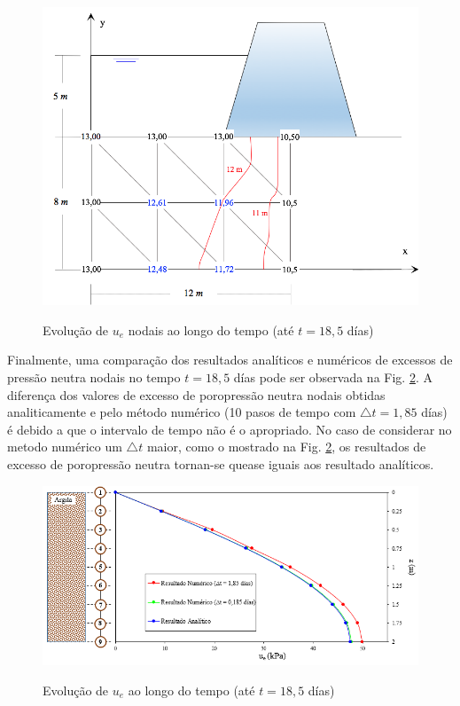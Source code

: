 \documentclass{article} %
\begin{document}
\begin{figure}[H]
	\centering
	\caption{Evolução de \(u_e\) nodais ao longo do tempo (até \(t=18,5\) días)}
	\includegraphics[width=1\linewidth]{result}	
	\label{result}	
\end{figure}
 Finalmente, uma comparação dos resultados analíticos e numéricos de excessos de pressão neutra nodais no tempo \(t=18,5\) días pode ser observada na Fig. \ref{comparacion}.
A diferença dos valores de excesso de poropressão neutra nodais obtidas analiticamente e pelo método numérico (10 pasos de tempo com \(\triangle t = 1,85\) días) é debido a que o intervalo de tempo não é o apropriado. No caso de considerar no metodo numérico um \(\triangle t\) maior, como o mostrado na Fig. \ref{comparacion}, os resultados de excesso de poropressão neutra tornan-se quease iguais aos resultado analíticos.
\begin{figure}[H]
	\centering
	\caption{Evolução de \(u_e\) ao longo do tempo (até \(t=18,5\) días)}
	\includegraphics[width=1\linewidth]{comparacion}	
	\label{comparacion}	
\end{figure}




%
%
\end{document}
